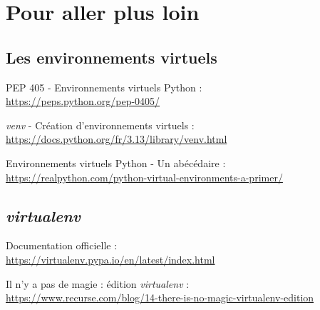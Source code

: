 \chapter{Pour aller plus loin}

\section*{Les environnements virtuels}
\begin{coloredenum}
    \item PEP 405 - Environnements virtuels Python :\\ \url{https://peps.python.org/pep-0405/}
    \item \textit{venv} - Création d'environnements virtuels :\\ \url{https://docs.python.org/fr/3.13/library/venv.html}
    \item Environnements virtuels Python - Un abécédaire : \\ \url{https://realpython.com/python-virtual-environments-a-primer/}
\end{coloredenum}

\section*{\textit{virtualenv}}
\begin{coloredenum}
    \item Documentation officielle :\\ \url{https://virtualenv.pypa.io/en/latest/index.html}
    \item Il n'y a pas de magie : édition \textit{virtualenv} :\\ \url{https://www.recurse.com/blog/14-there-is-no-magic-virtualenv-edition}
\end{coloredenum}
